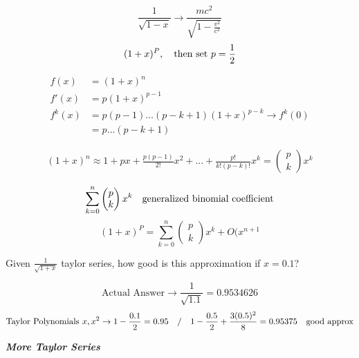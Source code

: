 \documentclass[svgnames]{article}   	%
\begin{document}
\vspace{5px} \[
\frac{1}{ \sqrt{1-x}} \rightarrow \frac{mc^2}{ \sqrt{1 - \frac{v^2}{c^2}}}
\] \vspace{5px}
\[
  (1+x)^P, \hspace{10px} \text{then set $p = \frac{1}{2}$}
\]

\begin{align*}
  f(x) &= (1+x)^n  \\ f'(x) &= p(1+x)^{p-1}  \\ f^k (x)  &= p(p-1) \dots
  (p-k+1)(1+x)^{p-k} \rightarrow f^k (0) \\ &= p \dots (p-k+1) 
\end{align*}

\begin{align*}
  (1+x)^n \approx 1 + px + \frac{p(p-1)}{2!}x^2 + ... + \frac{p!}{k!(p-k)!}x^k
  = \begin{pmatrix} p \\ k \end{pmatrix}x^k
\end{align*}

\vspace{5px} \[
  \sum_{k=0}^{n} \begin{pmatrix} p \\ k \end{pmatrix} x^k \hspace{10px}
  \text{generalized binomial coefficient} 
\] \vspace{5px}
\vspace{5px} \[
  (1+x)^P = \sum_{k=0}^{n} \begin{pmatrix} p \\ k \end{pmatrix} x^k + O(x^{n+1}
\] \vspace{5px}

\begin{tcolorbox}[colback = red!5!white, colframe = red!50!black, title
  = Question]
  
  Given $\frac{1}{ \sqrt{1+x}}$ taylor series, how good is this approximation
  if $x=0.1$? 

\end{tcolorbox}
\begin{tcolorbox}[colback = blue!5!white, colframe = blue!50!black, title
  = Solution]
\vspace{5px} \[
  \text{Actual Answer} \rightarrow  \frac{1}{\sqrt{1.1}} = 0.9534626
\] \vspace{5px}
\[
  \text{Taylor Polynomials $x, x^2$} \rightarrow 1 - \frac{0.1}{2} = 0.95
  \hspace{10px} / \hspace{10px} 1 - \frac{0.5}{2} + \frac{3(0.5)^2}{8}
  = 0.95375 \hspace{10px} \text{good approx}
\] \end{tcolorbox}
\textit{ \textbf{More Taylor Series}}
\end{document}
